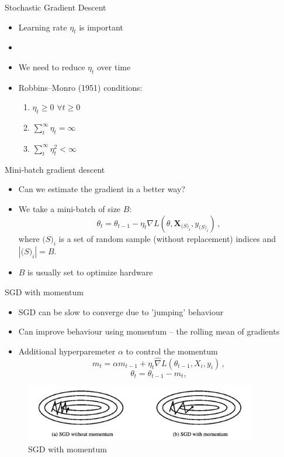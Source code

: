 \documentclass[10pt]{beamer}
\begin{document}
\begin{frame}{Stochastic Gradient Descent}


\begin{itemize}
\item Learning rate $\eta_t$ is important
\item {}\pause
\item We need to reduce $\eta_t$ over time\pause
\item Robbins–Monro (1951) conditions:
\begin{enumerate}
\item $\eta_t \geq 0$ $\forall t \geq 0$
\item $\sum^\infty_t \eta_t = \infty$
\item $\sum^\infty_t \eta_t^2 < \infty$
\end{enumerate}
\end{itemize}

\end{frame}


\begin{frame}{Mini-batch gradient descent}

\begin{itemize}
\item Can we estimate the gradient in a better way?\pause
\item We take a mini-batch of size $B$:
\[
\theta_t = \theta_{t-1} - \eta_t \nabla L(\theta, \mathbf{X}_{\mathcal(S)_i}, y_{\mathcal(S)_i})\,,
\]
where $\mathcal(S)_i$ is a set of random sample (without replacement) indices and $|\mathcal(S)_i| = B$.
\pause
\item $B$ is usually set to optimize hardware
\end{itemize}

\end{frame}


\begin{frame}{SGD with momentum}

\begin{itemize}
\item SGD can be slow to converge due to 'jumping' behaviour \pause
\item Can improve behaviour using momentum -- the rolling mean of gradients \pause
\item Additional hyperparemeter $\alpha$ to control the momentum
\[
m_t = \alpha m_{t-1} + \eta_t \hat{\nabla} L(\theta_{t-1}, X_{i}, y_{i})\,,
\]
\[
\theta_t = \theta_{t-1} - m_t,
\]

\end{itemize}

\begin{figure}[h]
\caption{SGD with momentum}
\centering
\includegraphics[width=0.9\textwidth]{figs/sgdm}
\end{figure}

\end{frame}
\end{document}
